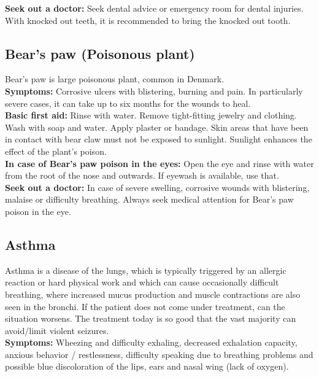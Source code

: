 \documentclass[../../../main.tex]{subfiles}
\begin{document}
\begin{multicols}{2}
\textbf{Seek out a doctor:} Seek dental advice or emergency room for dental injuries. With knocked out teeth, it is recommended to bring the knocked out tooth.
\\
\subsection*{Bear's paw (Poisonous plant)} Bear's paw is large poisonous plant, common in Denmark.
\\

\textbf{Symptoms:} Corrosive ulcers with blistering, burning and pain. In particularly severe cases, it can take up to six months for the wounds to heal.
\\

\textbf{Basic first aid:} Rinse with water. Remove tight-fitting jewelry and clothing. Wash with soap and water. Apply plaster or
bandage. Skin areas that have been in contact with bear claw must not be exposed to sunlight. Sunlight enhances the effect of the plant's poison.
\\

\textbf{In case of Bear's paw poison in the eyes:} Open the eye and rinse with water from the root of the nose and outwards. If eyewash is available, use that.
\\

\textbf{Seek out a doctor:} In case of severe swelling, corrosive wounds with blistering, malaise or difficulty breathing. Always seek medical attention for Bear's paw poison in the eye.
\\

\subsection*{Asthma} Asthma is a disease of the lungs, which is typically triggered by an allergic reaction or hard physical work and which can cause occasionally difficult breathing, where increased mucus production and muscle contractions are also seen in the bronchi. If the patient does not come under treatment, can
the situation worsens. The treatment today is so good that the vast majority can avoid/limit violent seizures.
\\

\textbf{Symptoms:} Wheezing and difficulty exhaling, decreased exhalation capacity, anxious behavior / restlessness, difficulty speaking due to breathing problems and possible blue discoloration of the lips, ears and nasal wing (lack of oxygen).
\\


\end{multicols}
\end{document}
